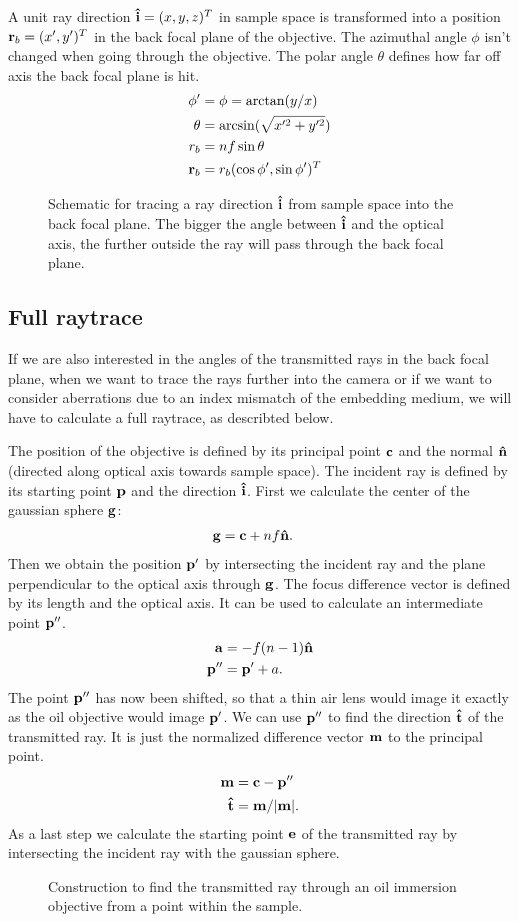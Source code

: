 A unit ray direction $\mathbf{\hat{i}}=(x,y,z)^T$ in sample space is transformed
into a position $\mathbf{r}_b=(x',y')^T$ in the back focal plane of the
objective. The azimuthal angle $\phi$ isn't changed when going through
the objective. The polar angle $\theta$ defines how far off axis the
back focal plane is hit.
\begin{align}
  \phi'&=\phi=\arctan(y/x)\\
  \theta&=\arcsin(\sqrt{x'^2+y'^2})\\
  r_b&=nf\sin\theta\\
  \mathbf{r}_b&=r_b(\cos\phi',\sin\phi')^T
\end{align}
 \begin{figure}[!hbt]
   \centering
   
   \caption{Schematic for tracing a ray direction $\mathbf{\hat{i}}$ from sample
     space into the back focal plane. The bigger the angle between
     $\mathbf{\hat{i}}$ and the optical axis, the further outside the ray will pass
     through the back focal plane.}
 \end{figure}
\subsection{Full raytrace}
If we are also interested in the angles of the transmitted rays in the
back focal plane, when we want to trace the rays further into the
camera or if we want to consider aberrations due to an index mismatch
of the embedding medium, we will have to calculate a full raytrace, as
describted below.

The position of the objective is defined by its principal point $\mathbf{c}$
and the normal $\mathbf{\hat{n}}$ (directed along optical axis towards sample
space). The incident ray is defined by its starting point $\mathbf{p}$ and the
direction $\mathbf{\hat{i}}$. First we calculate the center of the gaussian sphere
$\mathbf{g}$:
\begin{align}
  \mathbf{g} &= \mathbf{c} + nf \mathbf{\hat{n}}.
\end{align}
Then we obtain the position $\mathbf{p}'$ by intersecting the incident ray and
the plane perpendicular to the optical axis through $\mathbf{g}$.  The focus
difference vector is defined by its length and the optical axis. It
can be used to calculate an intermediate point $\mathbf{p}''$.
\begin{align}
  \mathbf{a} &= -f(n-1)\mathbf{\hat{n}} \\
  \mathbf{p}'' &= \mathbf{p}' + a.
\end{align}
The point $\mathbf{p}''$ has now been shifted, so that a thin air lens would
image it exactly as the oil objective would image $\mathbf{p}'$. We can use
$\mathbf{p}''$ to find the direction $\mathbf{\hat{t}}$ of the transmitted ray. It is just
the normalized difference vector $\mathbf{m}$ to the principal point.
\begin{align}
  \mathbf{m} &= \mathbf{c} - \mathbf{p}'' \\
  \mathbf{\hat{t}} &= \mathbf{m} / \mathopen| \mathbf{m} \mathclose|.
\end{align}
As a last step we calculate the starting point $\mathbf{e}$ of the transmitted
ray by intersecting the incident ray with the gaussian sphere.
\begin{figure}[!hbt]
  \centering
  
  \caption{Construction to find the transmitted ray through an oil
    immersion objective from a point within the sample.}
  \label{fig:obj-ref-full}
\end{figure}

